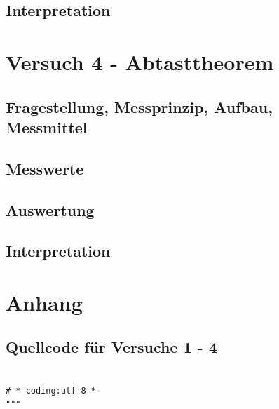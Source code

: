 \documentclass[12pt,oneside,a4paper]{report}
\begin{document}
\section{Interpretation}
\label{chap:VERSUCH_3_INTERPRETATION}

%
%
\chapter{Versuch 4 - Abtasttheorem}
\label{chap:VERSUCH_4}

\section{Fragestellung, Messprinzip, Aufbau, Messmittel}
\label{chap:VERSUCH_4_FRAGESTELLUNG}

\section{Messwerte}
\label{chap:VERSUCH_4_MESSWERTE}

\section{Auswertung}
\label{chap:VERSUCH_4_AUSWERTUNG}

\section{Interpretation}
\label{chap:VERSUCH_4_INTERPRETATION}
%
%
\renewcommand\thesection{A.\arabic{section}}
\renewcommand\thesubsection{\thesection.\arabic{subsection}}

\chapter*{Anhang}
\label{chap:APPENDIX}
\addtocounter{chapter}{1}
\setcounter{section}{0}

\section{Quellcode für Versuche 1 - 4}
\label{chap:APPENDIX_SOURCECODE}
\begin{lstlisting}[style=PYTHON, frame=single, caption=QuellCodeV1 bis V4, captionpos=b, label=lst:Code]

#-*-coding:utf-8-*-
"""
\end{lstlisting}
\end{document}

